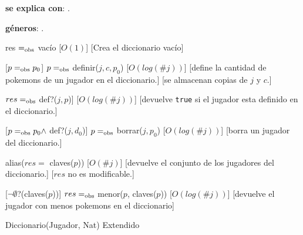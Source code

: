 \begin{Interfaz}
	\textbf{se explica con}: . 

	\textbf{géneros}: .


	{res $=_{\mathrm{obs}}$ vacío}
	[$O(1)$]
	[Crea el diccionario vacío]

	[$p =_{\mathrm{obs}} p_0$]
	{$p =_{\mathrm{obs}}$ definir($j, c, p_0$)}
	[$O(log(\#j))$]
	[define la cantidad de pokemons de un jugador en el diccionario.]
	[se almacenan copias de $j$ y $c$.]

	{$res =_{\mathrm{obs}}$ def?($j, p$)]}
	[$O(log(\#j))$]
	[devuelve \texttt{true} si el jugador esta definido en el diccionario.]

	[$p =_{\mathrm{obs}} p_0 \land$ def?($j, d_0$)]
	{$p =_{\mathrm{obs}}$ borrar($j, p_0$)}
	[$O(log(\#j))$]
	[borra un jugador del diccionario.]

	{alias($res =$ claves($p$))}
	[$O(\#j)$]
	[devuelve el conjunto de los jugadores del diccionario.]
	[$res$ no es modificable.]

	[$\neg\emptyset$?(claves($p$))]
	{$res =_{\mathrm{obs}}$ menor($p$, claves($p$))}
	[$O(log(\#j))$]
	[devuelve el jugador con menos pokemons en el diccionario]


  \begin{tad}{Diccionario(Jugador, Nat) Extendido}
    \parskip=0pt
    
    \tadAxiomas
  \end{tad}

\end{Interfaz}


